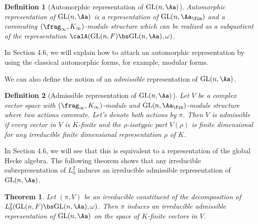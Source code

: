 \documentclass{article}
\newtheorem{theorem}{Theorem}[section]
\newtheorem{definition}{Definition}[section]
\newcommand{\GL}{\mathrm{GL}}
\begin{document}
\begin{definition}[Automorphic representation of $\GL(n, \Aa)$]
Automorphic representation of $\GL(n, \Aa)$ is a representation of $\GL(n, \Aa_{\fin})$ and a commuting $(\frag_{\infty}, K_{\infty})$-module structure which can be realized as a subquotient of the representation $\calA(\GL(n, F)\bs \GL(n, \Aa), \omega)$. 
\end{definition}
In Section 4.6, we will explain how to attach an automorphic representation by using the classical automorphic forms, for example, modular forms. 

We can also define the notion of an \emph{admissible} representation of $\GL(n, \Aa)$. 
\begin{definition}[Admissible representation of $\GL(n, \Aa)$]
Let $V$ be a complex vector space with $(\frag_{\infty}, K_{\infty})$-module and $\GL(n, \Aa_{\fin})$-module structure where two actions commute. 
Let's denote both actions by $\pi$. 
Then $V$ is admissible if every vector in $V$ is $K$-finite and the $\rho$-isotypic part $V(\rho)$ is finite dimensional for any irreducible finite dimensional representation $\rho$ of $K$. 
\end{definition}
In Section 4.6,  we will see that this is equivalent to a representation of the global Hecke algebra.
The following theorem shows that any irreducible subrepresentation of $L_{0}^{2}$ induces an irreducible admissible representation of $\GL(n, \Aa)$. 
\begin{theorem}
\label{l2autoad}
Let $(\pi, V)$ be an irreducible constituent of the decomposition of $L^{2}_{0}(\GL(n, F)\bs \GL(n, \Aa), \omega)$.
Then $\pi$ induces an irreducible admissible representation of $\GL(n, \Aa)$ on the space of $K$-finite vectors in $V$. 
\end{theorem}
\end{document}
